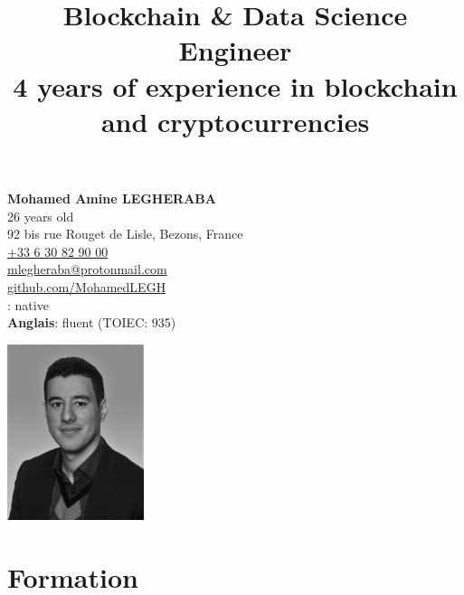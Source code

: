 \documentclass[10pt]{article}
\title{\bfseries{\huge{Blockchain \& Data Science Engineer}}\\[0.75cm] \Large{4 years of experience in blockchain and cryptocurrencies} }
\author{\bfseries\Huge \vspace{-4ex}}
\date{}
\begin{document}
\begin{minipage}[t]{0.80\textwidth}
\textbf{\Large{Mohamed Amine LEGHERABA}}\\
\vspace{4ex}26 years old\\
92 bis rue Rouget de Lisle, Bezons, France\\
\href{tel:+33630829000}{+33 6 30 82 90 00}\\
\href{mailto:mlegheraba@protonmail.com}{mlegheraba@protonmail.com}\\
\href{https://github.com/MohamedLEGH}{github.com/MohamedLEGH}\\
\vspace{5ex}{\bf French}: native\\
{\bf Anglais}: fluent (TOIEC: 935)\\
\end{minipage}
\begin{minipage}[t]{0.20\textwidth}
\vspace{-3ex}
\includegraphics[width=4cm]{figures/Legheraba-Mohamed-White.jpg}
\end{minipage}
{\let\newpage\relax\maketitle}
\thispagestyle{empty}

\vspace{-10ex}

\section*{Formation}

\vspace{2ex}
\end{document}
